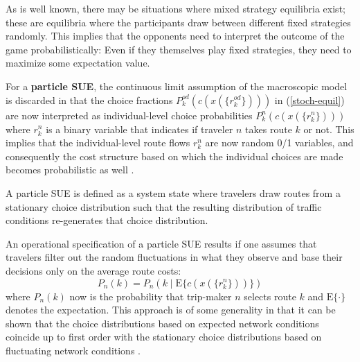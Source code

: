 As is well known, there may be situations where mixed strategy
equilibria exist; these are equilibria where the participants draw
between different fixed strategies randomly.  This implies that the
opponents need to interpret the outcome of the game probabilistically:
Even if they themselves play fixed strategies, they need to maximize
some expectation value.


For a \textbf{particle SUE}, the continuous limit assumption of the
macroscopic model is discarded in that the choice fractions 
$P^{od}_k(c(x(\{r^{od}_k\})))$ in (\ref{stoch-equil})
are now interpreted as individual-level choice probabilities
%
$P^{n}_k(c(x(\{r_k^{n}\})))$ where $r_k^{n}$ is a binary variable
that indicates if traveler $n$ takes route $k$ or not.
%
This implies that the individual-level route flows $r^{n}_k$ 
are now random 0/1 variables, and consequently
the cost structure based on which the individual choices are made
becomes probabilistic as well
\citep[][]{balijepalli-2007, cascetta-1991, cascetta-1989}.

A particle SUE is defined as a system state where travelers draw routes from a
stationary choice distribution such that the resulting distribution of
traffic conditions re-generates that choice distribution.

An operational specification of a particle SUE results if one
assumes that travelers filter out the random fluctuations in what
they observe and base their decisions only on the average route
costs:
\begin{equation}
\label{eq:sue-with-expectation}
P_n(k) = P_n\left( k \mid \text{E} \{ c( x( \{r^{n}_k\}) ) \} \right)
\end{equation}
where $P_n(k)$ now is the probability that trip-maker $n$
selects route $k$ and $\text{E}\{\cdot\}$ denotes the expectation.
%
This approach is of some generality in that it can be shown that the
choice distributions based on expected network conditions coincide up
to first order with the stationary choice distributions based on
fluctuating network conditions \citep[][]{floetteroed-2010e}.

